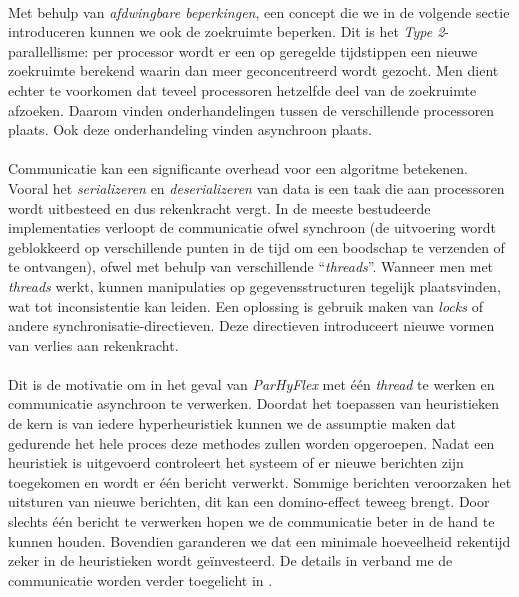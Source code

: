 \paragraph{}
Met behulp van \emph{afdwingbare beperkingen}, een concept die we in de volgende sectie introduceren kunnen we ook de zoekruimte beperken. Dit is het \emph{Type 2}-parallellisme: per processor wordt er een op geregelde tijdstippen een nieuwe zoekruimte berekend waarin dan meer geconcentreerd wordt gezocht. Men dient echter te voorkomen dat teveel processoren hetzelfde deel van de zoekruimte afzoeken. Daarom vinden onderhandelingen tussen de verschillende processoren plaats. Ook deze onderhandeling vinden asynchroon plaats.

\paragraph{}
Communicatie kan een significante overhead voor een algoritme betekenen. Vooral het \emph{serializeren} en \emph{deserializeren} van data is een taak die aan processoren wordt uitbesteed en dus rekenkracht vergt. In de meeste bestudeerde implementaties verloopt de communicatie ofwel synchroon (de uitvoering wordt geblokkeerd op verschillende punten in de tijd om een boodschap te verzenden of te ontvangen), ofwel met behulp van verschillende ``\emph{threads}''. Wanneer men met \emph{threads} werkt, kunnen manipulaties op gegevensstructuren tegelijk plaatsvinden, wat tot inconsistentie kan leiden. Een oplossing is gebruik maken van \emph{locks} of andere synchronisatie-directieven. Deze directieven introduceert nieuwe vormen van verlies aan rekenkracht.

\paragraph{}
Dit is de motivatie om in het geval van \emph{ParHyFlex} met \'e\'en \emph{thread} te werken en communicatie asynchroon te verwerken. Doordat het toepassen van heuristieken de kern is van iedere hyperheuristiek kunnen we de assumptie maken dat gedurende het hele proces deze methodes zullen worden opgeroepen. Nadat een heuristiek is uitgevoerd controleert het systeem of er nieuwe berichten zijn toegekomen en wordt er \'e\'en bericht verwerkt. Sommige berichten veroorzaken het uitsturen van nieuwe berichten, dit kan een domino-effect teweeg brengt. Door slechts \'e\'en bericht te verwerken hopen we de communicatie beter in de hand te kunnen houden. Bovendien garanderen we dat een minimale hoeveelheid rekentijd zeker in de heuristieken wordt ge\"investeerd. De details in verband me de communicatie worden verder toegelicht in .

